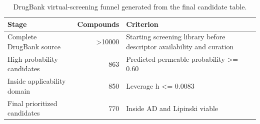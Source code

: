 \begin{table}[H]
\centering
\caption{DrugBank virtual-screening funnel generated from the final candidate table.}
\label{tab:py_drugbank_flow}
\begin{tabular}{lrp{}}
\toprule
Stage & Compounds & Criterion \\
\midrule
Complete DrugBank source & >10000 & Starting screening library before descriptor availability and curation \\
High-probability candidates & 863 & Predicted permeable probability >= 0.60 \\
Inside applicability domain & 850 & Leverage h <= 0.0083 \\
Final prioritized candidates & 770 & Inside AD and Lipinski viable \\
\bottomrule
\end{tabular}
\end{table}
